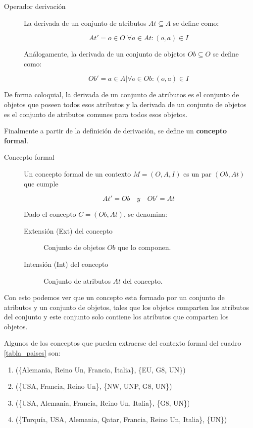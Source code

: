 	\begin{description}
		\item[Operador derivación] La derivada de un conjunto de atributos $At \subseteq A$ se define como: 
		
		\[ At' = {o \in O | \forall a \in At : (o, a) \in I} \]
		
		Análogamente, la derivada de un conjunto de objetos $Ob \subseteq O$ se define como:
		
		\[ Ob' = {a \in A | \forall o \in Ob : (o, a) \in I} \]
		
	\end{description}

	De forma coloquial, la derivada de un conjunto de atributos es el conjunto de objetos que poseen todos esos atributos y la derivada de un conjunto de objetos es el conjunto de atributos comunes para todos esos objetos.
	
	
	
	Finalmente a partir de la definición de derivación, se define un \textbf{concepto formal}.
	
	\begin{description}
		\item[Concepto formal] Un concepto formal de un contexto $M = (O,A,I)$ es un par $(Ob,At)$ que cumple
		
		\[ At' = Ob \quad y \quad Ob' = At		\] 
		
		Dado el concepto $C = (Ob, At)$, se denomina: 
		\begin{description}
			\item[Extensión (Ext) del concepto] Conjunto de objetos $Ob$ que lo componen.
			\item[Intensión (Int) del concepto] Conjunto de atributos $At$ del concepto. 
		\end{description}
	\end{description}

	
	Con esto podemos ver que un concepto esta formado por un conjunto de atributos y un conjunto de objetos, tales que los objetos comparten los atributos del conjunto y este conjunto solo contiene los atributos que comparten los objetos.
	
	Algunos de los conceptos que pueden extraerse del contexto formal del cuadro \ref{tabla_paises} son:
	
	\begin{enumerate}
		\item (\{Alemania, Reino Un, Francia, Italia\}, \{EU, G8, UN\}) 
		\item (\{USA, Francia, Reino Un\}, \{NW, UNP, G8, UN\})
		\item (\{USA, Alemania, Francia, Reino Un, Italia\}, \{G8, UN\})

		\item (\{Turquía, USA, Alemania, Qatar, Francia, Reino Un, Italia\}, \{UN\})
	\end{enumerate}
	
